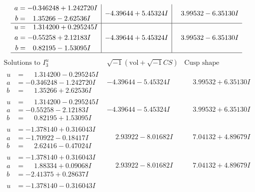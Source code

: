 \documentclass[1p]{elsarticle_modified}
\theoremstyle{definition}
\newcommand{\I}{\sqrt{-1}}
\begin{document}
$$\begin{array}{c|c|c}
\begin{aligned}
a &= -0.346248 + 1.242720 I \\
b &= \phantom{-}1.35266 - 2.62536 I\end{aligned}
 & -4.39644 + 5.45324 I & \phantom{-}3.99532 - 6.35130 I \\ \hline\begin{aligned}
u &= \phantom{-}1.314200 + 0.295245 I \\
a &= -0.55258 + 2.12183 I \\
b &= \phantom{-}0.82195 - 1.53095 I\end{aligned}
 & -4.39644 + 5.45324 I & \phantom{-}3.99532 - 6.35130 I\\
 \hline 
 \end{array}$$\newpage$$\begin{array}{c|c|c}  
\text{Solutions to }I^u_{3}& \I (\text{vol} + \sqrt{-1}CS) & \text{Cusp shape}\\
 \hline 
\begin{aligned}
u &= \phantom{-}1.314200 - 0.295245 I \\
a &= -0.346248 - 1.242720 I \\
b &= \phantom{-}1.35266 + 2.62536 I\end{aligned}
 & -4.39644 - 5.45324 I & \phantom{-}3.99532 + 6.35130 I \\ \hline\begin{aligned}
u &= \phantom{-}1.314200 - 0.295245 I \\
a &= -0.55258 - 2.12183 I \\
b &= \phantom{-}0.82195 + 1.53095 I\end{aligned}
 & -4.39644 - 5.45324 I & \phantom{-}3.99532 + 6.35130 I \\ \hline\begin{aligned}
u &= -1.378140 + 0.316043 I \\
a &= -1.70922 - 0.18417 I \\
b &= \phantom{-}2.62416 - 0.47024 I\end{aligned}
 & \phantom{-}2.93922 - 8.01682 I & \phantom{-}7.04132 + 4.89679 I \\ \hline\begin{aligned}
u &= -1.378140 + 0.316043 I \\
a &= \phantom{-}1.88334 + 0.09068 I \\
b &= -2.41375 + 0.28637 I\end{aligned}
 & \phantom{-}2.93922 - 8.01682 I & \phantom{-}7.04132 + 4.89679 I \\ \hline\begin{aligned}
u &= -1.378140 - 0.316043 I \\

\end{aligned}
\end{array}$$
\end{document}
